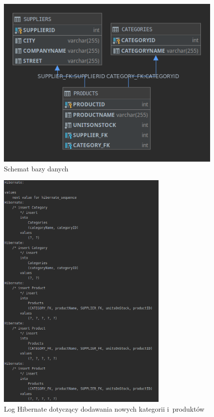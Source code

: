 \documentclass[12pt, a4paper]{mwart}
\begin{document}
\begin{figure}[ht]
  \centering
  \includegraphics[scale=0.75]{VI/6-5.png}
  \caption{Schemat bazy danych}
  \label{rys:6.5}
\end{figure}

\begin{figure}[ht]
  \centering
  \includegraphics[width=0.75\textwidth]{VI/6-2.png}
  \caption{Log Hibernate dotyczący dodawania nowych kategorii i~produktów}
  \label{rys:6.2}
\end{figure}
\end{document}
